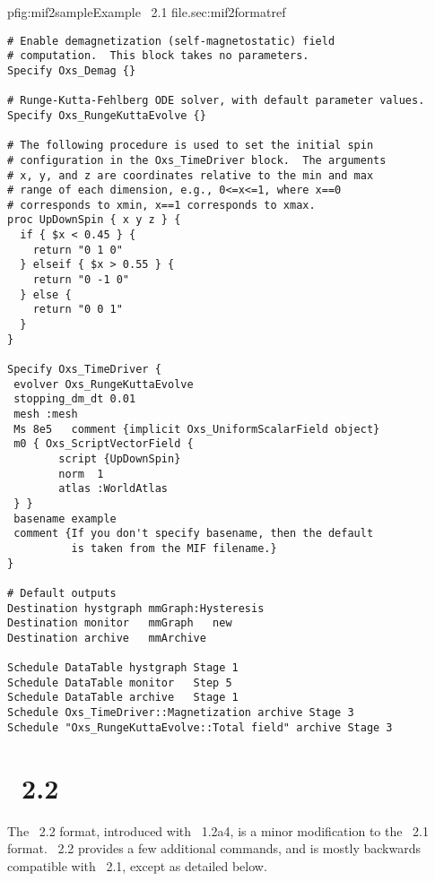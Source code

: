 \begin{codelisting}{p}{fig:mif2sample}{Example \MIF~2.1
   file.}{sec:mif2format}{ref}
\begin{verbatim}
# Enable demagnetization (self-magnetostatic) field
# computation.  This block takes no parameters.
Specify Oxs_Demag {}

# Runge-Kutta-Fehlberg ODE solver, with default parameter values.
Specify Oxs_RungeKuttaEvolve {}

# The following procedure is used to set the initial spin
# configuration in the Oxs_TimeDriver block.  The arguments
# x, y, and z are coordinates relative to the min and max
# range of each dimension, e.g., 0<=x<=1, where x==0
# corresponds to xmin, x==1 corresponds to xmax.
proc UpDownSpin { x y z } {
  if { $x < 0.45 } {
    return "0 1 0"
  } elseif { $x > 0.55 } {
    return "0 -1 0"
  } else {
    return "0 0 1"
  }
}

Specify Oxs_TimeDriver {
 evolver Oxs_RungeKuttaEvolve
 stopping_dm_dt 0.01
 mesh :mesh
 Ms 8e5   comment {implicit Oxs_UniformScalarField object}
 m0 { Oxs_ScriptVectorField {
        script {UpDownSpin}
        norm  1
        atlas :WorldAtlas
 } }
 basename example
 comment {If you don't specify basename, then the default
          is taken from the MIF filename.}
}

# Default outputs
Destination hystgraph mmGraph:Hysteresis
Destination monitor   mmGraph   new
Destination archive   mmArchive

Schedule DataTable hystgraph Stage 1
Schedule DataTable monitor   Step 5
Schedule DataTable archive   Stage 1
Schedule Oxs_TimeDriver::Magnetization archive Stage 3
Schedule "Oxs_RungeKuttaEvolve::Total field" archive Stage 3
\end{verbatim}
\end{codelisting}


\section{\MIF\ 2.2}\label{sec:mif22format}
The \MIF~2.2 format, introduced with \OOMMF~1.2a4, is a minor
modification to the \MIF~2.1 format.  \MIF~2.2 provides a few additional
commands, and is mostly backwards compatible with \MIF~2.1, except as
detailed below.
